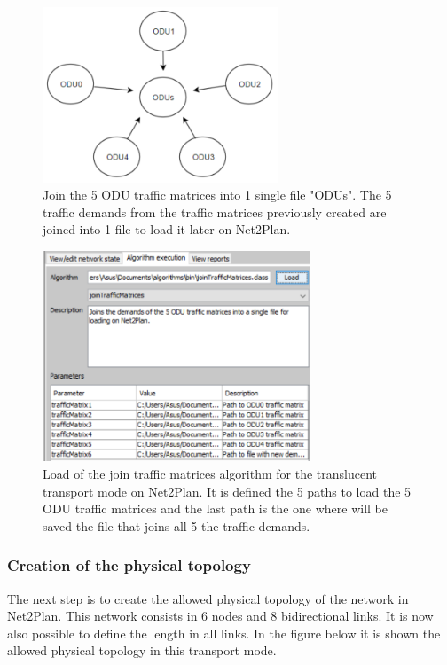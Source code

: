 \begin{figure}[h!]
\centering
\includegraphics[width=7cm]{sdf/heuristic/translucent_survivability/figures/join_matrices_odus}
\caption{Join the 5 ODU traffic matrices into 1 single file "ODUs". The 5 traffic demands from the traffic matrices previously created are joined into 1 file to load it later on Net2Plan.}
\label{join_matrices_odus_transl_surv}
\end{figure}

\begin{figure}[h!]
\centering
\includegraphics[width=8cm]{sdf/heuristic/translucent_survivability/figures/traffic_matrices}
\caption{Load of the join traffic matrices algorithm for the translucent transport mode on Net2Plan. It is defined the 5 paths to load the 5 ODU traffic matrices and the last path is the one where will be saved the file that joins all 5 the traffic demands.}
\label{traffic_matrices_transl_surv_ref}
\end{figure}

\newpage
\subsubsection{Creation of the physical topology}

\vspace{11pt}
The next step is to create the allowed physical topology of the network in Net2Plan. This network consists in 6 nodes and 8 bidirectional links. It is now also possible to define the length in all links. In the figure below it is shown the allowed physical topology in this transport mode.


